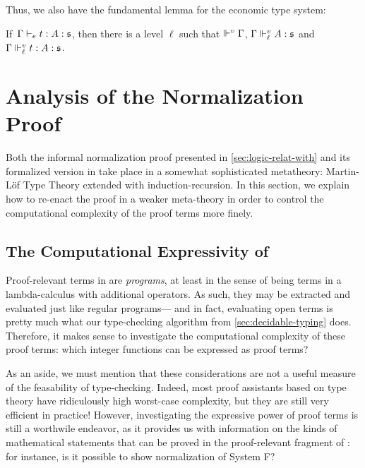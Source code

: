 Thus, we also have the fundamental lemma for the economic type system:
%
\begin{corollary}
  If\, \( \Gamma \vdash_{e} t : A : \mathfrak{s} \), then there is a level \( \ell \) such that ${\Vdash^v \Gamma}$,
  \( \Gamma \Vdash^v_{\ell} A : \mathfrak{s} \) and \( \Gamma \Vdash^v_{\ell} t : A : \mathfrak{s} \).
\end{corollary}

\section{Analysis of the Normalization Proof}
\label{sec:analys-norm-proof}

Both the informal normalization proof presented in \cref{sec:logic-relat-with}
and its formalized version in \Agda take place in a somewhat sophisticated metatheory: 
Martin-Löf Type Theory extended with induction-recursion.
%
In this section, we explain how to re-enact the proof in a weaker meta-theory in 
order to control the computational complexity of the proof terms more finely.

\subsection{The Computational Expressivity of \SetoidCC}

Proof-relevant terms in \SetoidCC are \emph{programs}, at least in the sense of 
being terms in a lambda-calculus with additional operators.
% 
As such, they may be extracted and evaluated just like regular programs---
and in fact, evaluating open terms is pretty much what our type-checking 
algorithm from \cref{sec:decidable-typing} does.
% 
Therefore, it makes sense to investigate the computational complexity of 
these proof terms: which integer functions
% 
% 
can be expressed as proof terms?

As an aside, we must mention that these considerations are not a useful measure 
of the feasability of type-checking.
% 
Indeed, most proof assistants based on type theory have ridiculously high 
worst-case complexity, but they are still very efficient in practice! 
% 
However, investigating the expressive power of proof terms is still a
worthwile endeavor, as it provides us with information on the kinds of mathematical
statements that can be proved in the proof-relevant fragment of \SetoidCC: for 
instance, is it possible to show normalization of System F?

